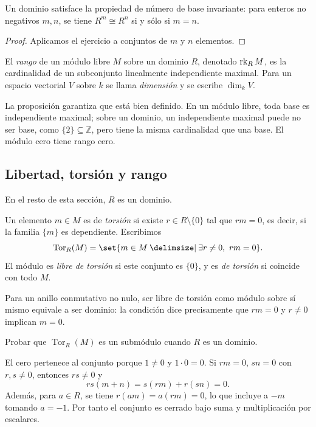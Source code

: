 \begin{coro}
Un dominio satisface la propiedad de número de base invariante: para enteros no negativos $m,n$, se tiene $R^m\cong R^n$ si y sólo si $m=n$.
\end{coro}
\begin{proof}
Aplicamos el ejercicio a conjuntos de $m$ y $n$ elementos.
\end{proof}

\begin{defi}
El \emph{rango} de un módulo libre $M$ sobre un dominio $R$, denotado $\operatorname{rk}_R M$, es la cardinalidad de un subconjunto linealmente independiente maximal. Para un espacio vectorial $V$ sobre $k$ se llama \emph{dimensión} y se escribe $\dim_k V$.
\end{defi}
La proposición garantiza que está bien definido. En un módulo libre, toda base es independiente maximal; sobre un dominio, un independiente maximal puede no ser base, como $\{2\}\subseteq\mathbb Z$, pero tiene la misma cardinalidad que una base. El módulo cero tiene rango cero.

\subsection{Libertad, torsión y rango}\label{tema:20-3-1}\label{tema:21-2-1}
En el resto de esta sección, $R$ es un dominio.
\begin{defi}
Un elemento $m\in M$ es de \emph{torsión} si existe $r\in R\setminus\{0\}$ tal que $rm=0$, es decir, si la familia $\{m\}$ es dependiente. Escribimos
\[
\operatorname{Tor}_R(M)=\set{m\in M\given \exists r\ne0,\ rm=0}.
\]
El módulo es \emph{libre de torsión} si este conjunto es $\{0\}$, y es \emph{de torsión} si coincide con todo $M$.
\end{defi}
Para un anillo conmutativo no nulo, ser libre de torsión como módulo sobre sí mismo equivale a ser dominio: la condición dice precisamente que $rm=0$ y $r\ne0$ implican $m=0$.

\begin{ejer}\label{ejer:C20-torsion}
Probar que $\operatorname{Tor}_R(M)$ es un submódulo cuando $R$ es un dominio.
\end{ejer}
\begin{sol}
El cero pertenece al conjunto porque $1\ne0$ y $1\cdot0=0$. Si $rm=0$, $sn=0$ con $r,s\ne0$, entonces $rs\ne0$ y
\[
rs(m+n)=s(rm)+r(sn)=0.
\]
Además, para $a\in R$, se tiene $r(am)=a(rm)=0$, lo que incluye a $-m$ tomando $a=-1$. Por tanto el conjunto es cerrado bajo suma y multiplicación por escalares.
\end{sol}

